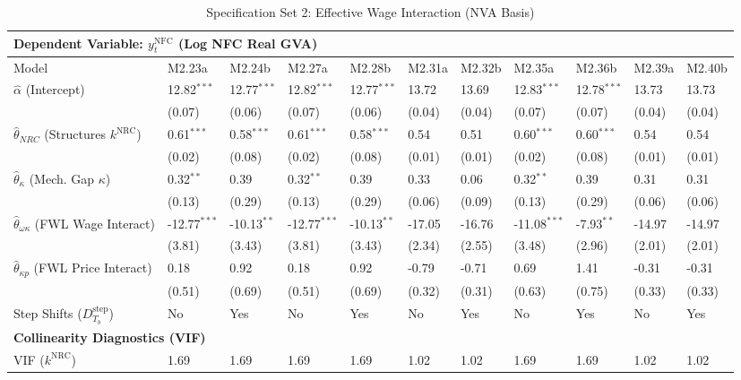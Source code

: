 \begin{table}[H]
\centering
\setlength{\tabcolsep}{1.5pt}
\caption{Specification Set 2: Effective Wage Interaction (NVA Basis)}
\label{tab:specB_set2_nva}
\tiny
\begin{tabular}{p{3.5cm}p{1.0cm}p{1.0cm}p{1.0cm}p{1.0cm}p{1.0cm}p{1.0cm}p{1.0cm}p{1.0cm}p{1.0cm}p{1.0cm}}
\toprule
\multicolumn{11}{l}{\textbf{Dependent Variable: $y_t^{\text{NFC}}$ (Log NFC Real GVA)}} \\
\midrule
Model & M2.23a & M2.24b & M2.27a & M2.28b & M2.31a & M2.32b & M2.35a & M2.36b & M2.39a & M2.40b \\
\midrule
$\hat{\alpha}$ (Intercept) & 12.82$^{***}$ & 12.77$^{***}$ & 12.82$^{***}$ & 12.77$^{***}$ & 13.72 & 13.69 & 12.83$^{***}$ & 12.78$^{***}$ & 13.73 & 13.73 \\
 & (0.07) & (0.06) & (0.07) & (0.06) & (0.04) & (0.04) & (0.07) & (0.07) & (0.04) & (0.04) \\
$\hat{\theta}_{NRC}$ (Structures $k^{\text{NRC}}$) & 0.61$^{***}$ & 0.58$^{***}$ & 0.61$^{***}$ & 0.58$^{***}$ & 0.54 & 0.51 & 0.60$^{***}$ & 0.60$^{***}$ & 0.54 & 0.54 \\
 & (0.02) & (0.08) & (0.02) & (0.08) & (0.01) & (0.01) & (0.02) & (0.08) & (0.01) & (0.01) \\
$\hat{\theta}_{\kappa}$ (Mech. Gap $\kappa$) & 0.32$^{**}$ & 0.39 & 0.32$^{**}$ & 0.39 & 0.33 & 0.06 & 0.32$^{**}$ & 0.39 & 0.31 & 0.31 \\
 & (0.13) & (0.29) & (0.13) & (0.29) & (0.06) & (0.09) & (0.13) & (0.29) & (0.06) & (0.06) \\
$\hat{\theta}_{\omega\kappa}$ (FWL Wage Interact) & -12.77$^{***}$ & -10.13$^{**}$ & -12.77$^{***}$ & -10.13$^{**}$ & -17.05 & -16.76 & -11.08$^{***}$ & -7.93$^{**}$ & -14.97 & -14.97 \\
 & (3.81) & (3.43) & (3.81) & (3.43) & (2.34) & (2.55) & (3.48) & (2.96) & (2.01) & (2.01) \\
$\hat{\theta}_{\kappa p}$ (FWL Price Interact) & 0.18 & 0.92 & 0.18 & 0.92 & -0.79 & -0.71 & 0.69 & 1.41 & -0.31 & -0.31 \\
 & (0.51) & (0.69) & (0.51) & (0.69) & (0.32) & (0.31) & (0.63) & (0.75) & (0.33) & (0.33) \\
Step Shifts ($D_{T_b}^{\text{step}}$) & No & Yes & No & Yes & No & Yes & No & Yes & No & Yes \\
\midrule
\multicolumn{11}{l}{\textbf{Collinearity Diagnostics (VIF)}} \\
VIF ($k^{\text{NRC}}$) & 1.69 & 1.69 & 1.69 & 1.69 & 1.02 & 1.02 & 1.69 & 1.69 & 1.02 & 1.02 \\

\end{tabular}
\end{table}
